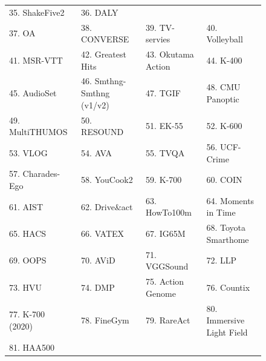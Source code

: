 \begin{figure}[t]
{\begin{tabular}{llll}
      35. ShakeFive2~\citep{van2016spatio} &
      36. DALY~\citep{weinzaepfel2016towards} \\
      37. OA~\citep{li2016recognition} &
      38. CONVERSE~\citep{edwards2016pose} &
      39. TV-servies~\citep{de2016online} & 
      40. Volleyball~\citep{ibrahim2016hierarchical} \\
      41. MSR-VTT~\citep{xu2016msr} &
      42. Greatest Hits~\citep{owens2016visually} &
      43. Okutama Action~\citep{barekatain2017okutama} &
      44. K-400~\citep{kay2017kinetics} \\
      45. AudioSet~\citep{gemmeke2017audio} &
      46. Smthng-Smthng (v1/v2)~\citep{goyal2017something} &
      47. TGIF~\citep{jang2017tgif} &
      48. CMU Panoptic~\citep{joo2017panoptic} \\
      49. MultiTHUMOS~\citep{yeung2018every} &  
      50. RESOUND~\citep{li2018resound} &
      51. EK-55~\citep{damen2018scaling} &
      52. K-600~\citep{carreira2018short} \\
      53. VLOG~\citep{fouhey2018lifestyle} &
      54. AVA~\citep{gu2018ava} &
      55. TVQA~\citep{lei2018tvqa} &
      56. UCF-Crime~\citep{sultani2018real} \\
      57. Charades-Ego~\citep{sigurdsson2018charades} &
      58. YouCook2~\citep{zhou2018towards} &
      59. K-700~\citep{carreira2019short} &
      60. COIN~\citep{tang2019coin} \\
      61. AIST~\citep{tsuchida2019aist} &
      62. Drive\&act~\citep{martin2019drive} &
      63. HowTo100m~\citep{miech2019howto100m}&
      64. Moments in Time~\citep{monfort2019moments} \\
      65. HACS~\citep{zhao2019hacs} &
      66. VATEX~\citep{wang2019vatex} &
      67. IG65M~\citep{ghadiyaram2019large} &
      68. Toyota Smarthome~\citep{dai2022toyota} \\
      69. OOPS~\citep{epstein2020oops} &
      70. AViD~\citep{piergiovanni2020avid} &
      71. VGGSound~\citep{chen2020vggsound} &
      72. LLP~\citep{tian2020unified} \\
      73. HVU~\citep{diba2020large} &
      74. DMP~\citet{ortega2020dmd} &
      75. Action Genome~\citep{ji2020action} &
      76. Countix~\citep{dwibedi2020counting} \\
      77. K-700 (2020)~\citep{smaira2020short} &
      78. FineGym~\citep{shao2020finegym} & 
      79. RareAct~\citep{miech2020rareact} &
      80. Immersive Light Field~\citet{broxton2020immersive} \\
      81. HAA500 \citep{chung2021haa500} &

\end{tabular}}
\end{figure}

